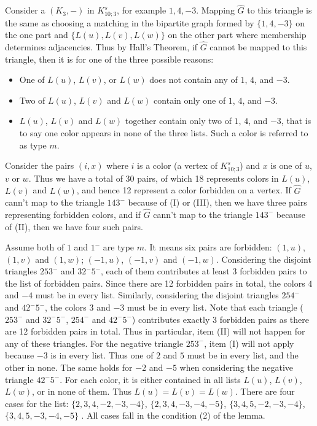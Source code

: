 \documentclass[11pt,a4paper]{article}
\makeatletter
\renewenvironment{proof}[1][\proofname]{\par
	\pushQED{\qed}%
	\normalfont \topsep6\p@\@plus6\p@\relax
	\trivlist
	\item[\hskip\labelsep
	\bfseries
	#1\@addpunct{.}]\ignorespaces
}{%
	\popQED\endtrivlist\@endpefalse
}
\theoremstyle{definition}
\makeatother
\begin{document}
	\begin{proof}
		Consider a $(K_3, -)$ in $K_{10;3}^{s}$, for example $1,4, -3$.  Mapping $\widehat{G}$ to this triangle is the same as choosing a matching in the bipartite graph formed by $\{1, 4, -3\}$ on the one part and $\{L(u), L(v), L(w)\}$ on the other part where membership determines adjacencies. Thus by Hall's Theorem, if $\widehat{G}$ cannot be mapped to this triangle, then it is for one of the three possible reasons:
		
		\begin{itemize}
			\item[(I)] One of $L(u)$, $L(v)$, or $L(w)$ does not contain any of $1$, $4$, and $-3$.
			\item[(II)] Two of $L(u)$, $L(v)$ and $L(w)$ contain only one of $1$, $4$, and $-3$.
			\item[(III)] $L(u)$, $L(v)$ and $L(w)$ together contain only two of $1$, $4$, and $-3$, that is to say one color appears in none of the three lists. Such a color is referred to as type $m$.
		\end{itemize} 
	
		Consider the pairs $(i,x)$ where $i$ is a color (a vertex of $K_{10;3}^{s}$) and $x$ is one of $u$, $v$ or $w$. Thus we have a total of 30 pairs, of which 18 represents colors in $L(u)$, $L(v)$ and $L(w)$, and hence 12 represent a color forbidden on a vertex. If $\widehat{G}$ cann't map to the triangle $143^{-}$ because of (I) or (III), then we have three pairs representing forbidden colors, and if $\widehat{G}$ cann't map to the triangle $143^{-}$ because of (II), then we have four such pairs. 
		
		Assume both of  $1$ and $1^-$ are type $m$. It means six pairs are forbidden: $(1,u)$, $(1,v)$ and $(1, w)$; $(-1,u)$, $(-1,v)$ and $(-1, w)$. Considering the disjoint triangles $253^-$ and $32^{-}5^{-}$, each of them contributes at least 3 forbidden pairs to the list of forbidden pairs. Since there are 12 forbidden pairs in total, the colors $4$ and $-4$ must be in every list. Similarly, considering the disjoint triangles $254^-$ and $42^{-}5^{-}$, the colors $3$ and $-3$ must be in every list. 
		Note that  each triangle ($253^-$ and $32^{-}5^{-}$, $254^-$ and $42^{-}5^{-}$) contributes exactly 3 forbidden pairs as there are 12 forbidden pairs in total. Thus in particular, item (II) will not happen for any of these triangles. 
		For the negative triangle $253^{-}$, item (I)  will not apply because $-3$ is in every list. Thus one of $2$ and $5$ must be in every list, and the other in none. The same holds for $-2$ and $-5$ when considering the negative triangle $42^{-}5^{-}$. For each color, it is either contained in all lists  $L(u)$, $L(v)$, $L(w)$, or in none of them. Thus $L(u)=L(v)=L(w)$.  There are  four cases for the list: $\{2, 3, 4, -2, -3, -4\}$, $\{2, 3, 4, -3, -4, -5\}$, $\{3, 4, 5, -2, -3, -4\}$, $\{3, 4, 5, -3, -4, -5\}$ . All cases fall in the condition (2) of the lemma.  
		

\end{proof}
\end{document}
